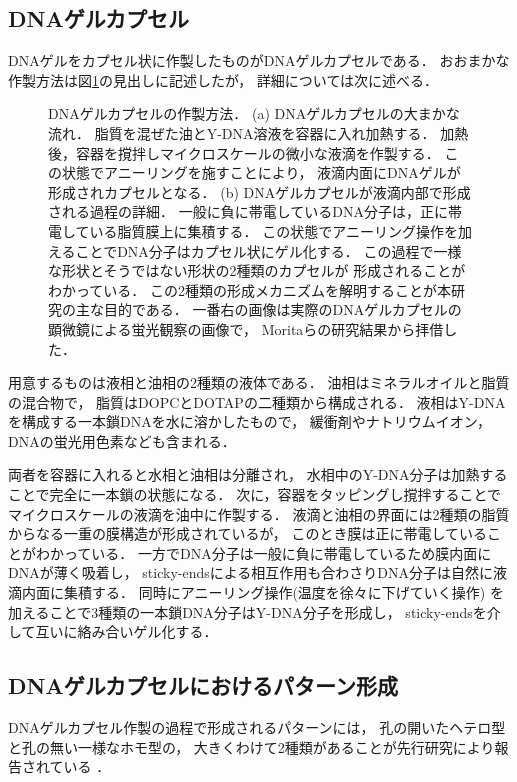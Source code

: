 \subsection{DNAゲルカプセル}
DNAゲルをカプセル状に作製したものがDNAゲルカプセルである．
おおまかな作製方法は図\ref{fig:capsule}の見出しに記述したが，
詳細については次に述べる．
\begin{figure}
    \centering
    
    \caption{DNAゲルカプセルの作製方法．
        (a) DNAゲルカプセルの大まかな流れ．
            脂質を混ぜた油とY-DNA溶液を容器に入れ加熱する．
            加熱後，容器を撹拌しマイクロスケールの微小な液滴を作製する．
            この状態でアニーリングを施すことにより，
            液滴内面にDNAゲルが形成されカプセルとなる．
        (b) DNAゲルカプセルが液滴内部で形成される過程の詳細．
            一般に負に帯電しているDNA分子は，正に帯電している脂質膜上に集積する．
            この状態でアニーリング操作を加えることでDNA分子はカプセル状にゲル化する．
            この過程で一様な形状とそうではない形状の2種類のカプセルが
            形成されることがわかっている\cite{moritasan}．
            この2種類の形成メカニズムを解明することが本研究の主な目的である．
            一番右の画像は実際のDNAゲルカプセルの顕微鏡による蛍光観察の画像で，
            Moritaらの研究結果から拝借した\cite{moritasan}．
    }
    \label{fig:capsule}
\end{figure}

用意するものは液相と油相の2種類の液体である．
油相はミネラルオイルと脂質の混合物で，
脂質はDOPCとDOTAPの二種類から構成される．
液相はY-DNAを構成する一本鎖DNAを水に溶かしたもので，
緩衝剤やナトリウムイオン，DNAの蛍光用色素なども含まれる．

両者を容器に入れると水相と油相は分離され，
水相中のY-DNA分子は加熱することで完全に一本鎖の状態になる．
次に，容器をタッピングし撹拌することでマイクロスケールの液滴を油中に作製する．
液滴と油相の界面には2種類の脂質からなる一重の膜構造が形成されているが，
このとき膜は正に帯電していることがわかっている\cite{morita2017formation}．
一方でDNA分子は一般に負に帯電しているため膜内面にDNAが薄く吸着し，
sticky-endsによる相互作用も合わさりDNA分子は自然に液滴内面に集積する．
同時にアニーリング操作(温度を徐々に下げていく操作)
を加えることで3種類の一本鎖DNA分子はY-DNA分子を形成し，
sticky-endsを介して互いに絡み合いゲル化する．


\subsection{DNAゲルカプセルにおけるパターン形成}
DNAゲルカプセル作製の過程で形成されるパターンには，
孔の開いたヘテロ型と孔の無い一様なホモ型の，
大きくわけて2種類があることが先行研究により報告されている
\cite{moritasan}．

